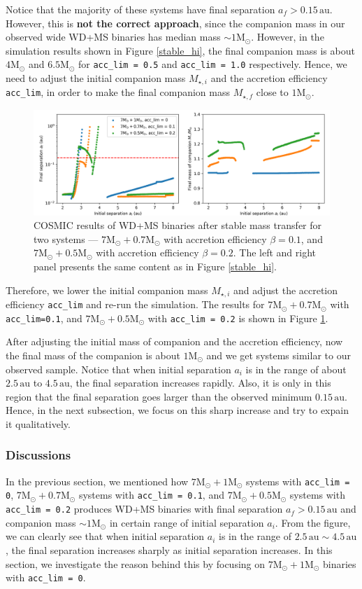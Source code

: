 \documentclass[12pt]{article}
\newcommand{\Msun}{\mathrm{M_{\odot}}}
\newcommand{\au}{\, \mathrm{au}}
\begin{document}
Notice that the majority of these systems have final separation $a_f > 0.15 \au$. However, this is \textbf{not the correct approach}, since the companion mass in our observed wide WD+MS binaries has median mass $\sim 1\Msun$. However, in the simulation results shown in Figure \ref{stable_hi}, the final companion mass is about $4 \Msun$ and $6.5\Msun$ for \verb|acc_lim = 0.5| and \verb|acc_lim = 1.0| respectively. Hence, we need to adjust the  initial companion mass $M_{\star, i}$ and the accretion efficiency \verb|acc_lim|, in order to make the final companion mass $M_{\star, f}$ close to $1\Msun$.

\begin{figure}
    \centering
    \includegraphics[width = 0.75\linewidth]{stable7+1ex.png}
    \caption{COSMIC results of WD+MS binaries after stable mass transfer for two systems — $7\Msun + 0.7\Msun$ with accretion efficiency $\beta = 0.1$, and $7\Msun + 0.5\Msun$ with accretion efficiency $\beta = 0.2$. The left and right panel presents the same content as in Figure \ref{stable_hi}.}
    \label{stable_hi_ex}
\end{figure}

Therefore, we lower the initial companion mass $M_{\star, i}$ and adjust the accretion efficiency \verb|acc_lim| and re-run the simulation. The results for $7\Msun + 0.7\Msun$ with \verb|acc_lim=0.1|, and $7\Msun + 0.5\Msun$ with \verb|acc_lim = 0.2| is shown in Figure \ref{stable_hi_ex}.

After adjusting the initial mass of companion and the accretion efficiency, now the final mass of the companion is about $1\Msun$ and we get systems similar to our observed sample. Notice that when initial separation $a_i$ is in the range of about $2.5 \au$ to $4.5 \au$, the final separation increases rapidly. Also, it is only in this region that the final separation goes larger than the observed minimum $0.15 \au$. Hence, in the next subsection, we focus on this sharp increase and try to expain it qualitatively.

\subsubsection{Discussions}
In the previous section, we mentioned how $7\Msun + 1 \Msun$ systems with \verb|acc_lim = 0|, $7 \Msun + 0.7\Msun$ systems with \verb|acc_lim = 0.1|, and $7 \Msun + 0.5 \Msun$ systems with \verb|acc_lim = 0.2| produces WD+MS binaries with final separation $a_f > 0.15 \au$ and companion mass $\sim 1 \Msun$ in certain range of initial separation $a_i$. From the figure, we can clearly see that when initial separation $a_i$ is in the range of $2.5 \au \sim 4.5\au$, the final separation increases sharply as initial separation increases. In this section, we investigate the reason behind this by focusing on $7\Msun + 1\Msun$ binaries with \verb|acc_lim = 0|.
\end{document}

